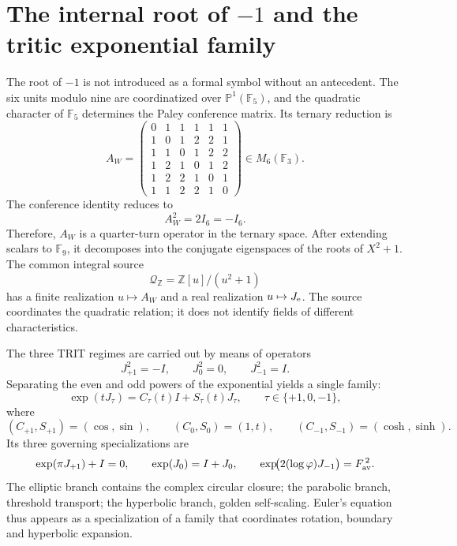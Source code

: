 \label{chap:p3-83-26-raiz_menos_uno}

\section*{The internal root of \texorpdfstring{\(-1\)}{-1} and the tritic exponential family}

The root of \(-1\) is not introduced as a formal symbol without an
antecedent. The six units modulo nine are coordinatized over
\(\mathbb P^1(\mathbb F_5)\), and the quadratic character of \(\mathbb F_5\) determines the
Paley conference matrix. Its ternary reduction is
\[
 A_W=
 \begin{pmatrix}
 0&1&1&1&1&1\\
 1&0&1&2&2&1\\
 1&1&0&1&2&2\\
 1&2&1&0&1&2\\
 1&2&2&1&0&1\\
 1&1&2&2&1&0
 \end{pmatrix}\in M_6(\mathbb F_3).
\]
The conference identity reduces to
\begin{equation}\label{p3-83-c26-s1:eq:constantes-raiz-interna-menos-uno}
 \boxed{A_W^2=2I_6=-I_6.}
\end{equation}
Therefore, \(A_W\) is a quarter-turn operator in the ternary space.
After extending scalars to \(\mathbb F_9\), it decomposes into the conjugate
eigenspaces of the roots of \(X^2+1\). The common integral source
\[
 \mathcal Q_{\mathbb Z}=\mathbb Z[u]/(u^2+1)
\]
has a finite realization \(u\mapsto A_W\) and a real realization
\(u\mapsto J_{\rm e}\). The source coordinates the quadratic relation; it does not
identify fields of different characteristics.

The three TRIT regimes are carried out by means of operators
\[
 J_{+1}^2=-I,\qquad J_0^2=0,\qquad J_{-1}^2=I.
\]
Separating the even and odd powers of the exponential yields a single family:
\begin{equation}\label{p3-83-c26-s1:eq:constantes-euler-extendido}
 \boxed{
 \exp(tJ_\tau)=C_\tau(t)I+S_\tau(t)J_\tau,
 \qquad \tau\in\{+1,0,-1\},}
\end{equation}
where
\[
 (C_{+1},S_{+1})=(\cos,\sin),\qquad
 (C_0,S_0)=(1,t),\qquad
 (C_{-1},S_{-1})=(\cosh,\sinh).
\]
Its three governing specializations are
\begin{equation}\label{p3-83-c26-s1:eq:constantes-euler-tres-ramas}
 \exp(\pi J_{+1})+I=0,\qquad
 \exp(J_0)=I+J_0,\qquad
 \exp\!\bigl(2(\log\varphi)J_{-1}\bigr)=F_{\rm av}^{\,2}.
\end{equation}
The elliptic branch contains the complex circular closure; the parabolic branch,
threshold transport; the hyperbolic branch, golden self-scaling. Euler’s equation
thus appears as a specialization of a family that coordinates rotation,
boundary and hyperbolic expansion.


